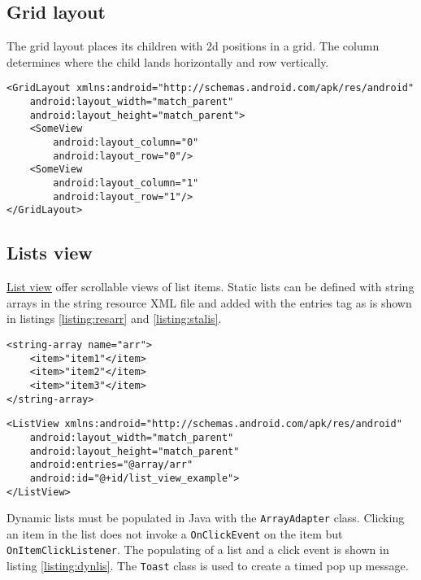 \subsection{Grid layout}
The grid layout places its children with 2d positions in a grid. The column determines where the child lands horizontally and row vertically.
\begin{lstlisting}[style=A_XML, caption={Grid layout declaration}, label = {listing:gridlay}]
<GridLayout xmlns:android="http://schemas.android.com/apk/res/android"
    android:layout_width="match_parent"
    android:layout_height="match_parent">
    <SomeView
        android:layout_column="0"
        android:layout_row="0"/>
    <SomeView
        android:layout_column="1"
        android:layout_row="1"/>
</GridLayout>
\end{lstlisting}

\subsection{Lists view}
\href{https://github.com/JonSteinn/AndroidDevelopment/tree/master/examples/lab1/list}{List view} offer scrollable views of list items. Static lists can be defined with string arrays in the string resource XML file and added with the entries tag as is shown in listings \ref{listing:resarr} and \ref{listing:stalis}.
\begin{lstlisting}[style=A_XML, caption={Resource string array}, label = {listing:resarr}]
<string-array name="arr">
    <item>"item1"</item>
    <item>"item2"</item>
    <item>"item3"</item>
</string-array>
\end{lstlisting}
\begin{lstlisting}[style=A_XML, caption={Static list}, label = {listing:stalis}]
<ListView xmlns:android="http://schemas.android.com/apk/res/android"
    android:layout_width="match_parent"
    android:layout_height="match_parent"
    android:entries="@array/arr"
    android:id="@+id/list_view_example">
</ListView>
\end{lstlisting}

Dynamic lists must be populated in Java with the \texttt{ArrayAdapter} class. Clicking an item in the list does not invoke a \texttt{OnClickEvent} on the item but \texttt{OnItemClickListener}. The populating of a list and a click event is shown in listing \ref{listing:dynlis}. The \texttt{Toast} class is used to create a timed pop up message.

